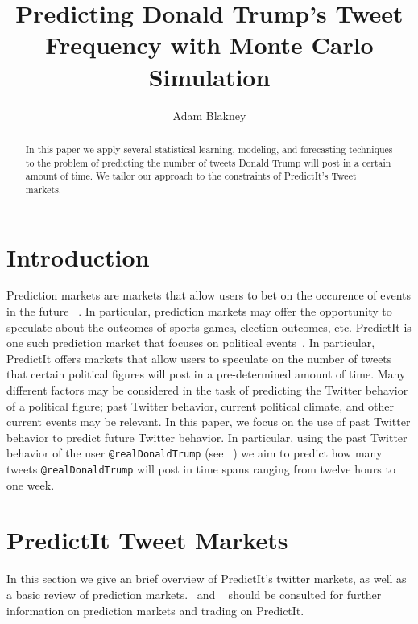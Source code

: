 \documentclass{article}
\begin{document}
\title{Predicting Donald Trump's Tweet Frequency with Monte Carlo Simulation}
\author[1]{Adam Blakney}%
\date{}%
\maketitle

\begin{abstract}
In this paper we apply several statistical learning, modeling,
and forecasting techniques to the problem of predicting the number of tweets Donald Trump will post in
a certain amount of time. We tailor our approach to the constraints of PredictIt's Tweet markets.
\end{abstract}

\section{Introduction}
Prediction markets are markets that allow users to bet on the occurence of events in the future ~\cite{def}.
In particular,
prediction markets may offer the opportunity to speculate about the outcomes of sports games, election outcomes,
etc. PredictIt is one such prediction market that focuses on political events~\cite{predictit}.
In particular, PredictIt offers markets that allow users to speculate on the number of tweets that certain
political figures will post in a pre-determined amount of time. Many different factors may be considered
in the task of predicting the Twitter behavior of a political figure; past Twitter behavior, current political
climate, and other current events may be relevant. In this paper, we focus on the use of past Twitter behavior
to predict future Twitter behavior. In particular, using the past Twitter behavior of the user
\lstinline{@realDonaldTrump} (see ~\cite{trump}) we aim to predict how many tweets
\lstinline{@realDonaldTrump} will post in time spans ranging from twelve hours to one week.

\section{PredictIt Tweet Markets}
In this section we give an brief overview of PredictIt's twitter markets, as well as a basic review of prediction markets.~\cite{def} and ~\cite{trading}
should be consulted for further information on prediction markets and trading on PredictIt.
\end{document}
